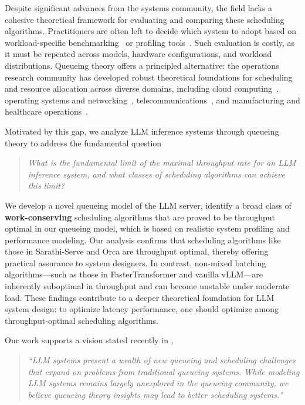 \documentclass[11pt]{article}
\theoremstyle{plain}
\theoremstyle{definition}
\theoremstyle{remark}
\begin{document}
Despite significant advances from the systems community, the field lacks a cohesive theoretical framework for evaluating and comparing these scheduling algorithms. Practitioners are often left to decide which system to adopt based on workload-specific benchmarking~\citep{databricks_llm_2023} or profiling tools~\citep{pytorch_profiler,nvidia_nsight}. Such evaluation is costly, as it must be repeated across models, hardware configurations, and workload distributions. Queueing theory offers a principled alternative: the operations research community has developed robust theoretical foundations for scheduling and resource allocation across diverse domains, including cloud computing~\citep{mitzenmacher2001power,grosof_new_2023,tirmazi_borg_2020,patke_queue_2024,ghodsi_dominant_2011,zhang2023shepherd}, operating systems and networking~\citep{yu2021nsdi,stoica1998core,iyer2023achieving,li2024libpreemptible}, telecommunications~\citep{whitt1993tail,maglaris1988performance,canetti1995bounding}, and manufacturing and healthcare operations~\citep{hu_optimal_2022,chen_optimal_2025,zychlinski_managing_2023}.


Motivated by this gap, we analyze LLM inference systems through queueing theory to address the fundamental question \begin{quote} \it{What is the fundamental limit of the maximal throughput rate for an LLM inference system, and what classes of scheduling algorithms can achieve this limit?} \end{quote}

We develop a novel queueing  model of  the LLM server, identify a broad class of \textbf{work-conserving} scheduling algorithms
that are proved to be throughput optimal in our queueing model, which is based on realistic system profiling and performance modeling. Our analysis confirms that scheduling algorithms like those in Sarathi-Serve and Orca are throughput optimal, thereby offering practical assurance to system designers. In contrast, non-mixed batching algorithms---such as those in FasterTransformer and vanilla vLLM---are inherently suboptimal in throughput and can become unstable under moderate load. These findings contribute to a deeper theoretical foundation for LLM system design: to optimize latency performance, one should optimize among throughput-optimal scheduling algorithms. 



Our work supports a vision stated recently in  \cite{mitzenmacher2025queueing}, 
\begin{quote}
    \textit{``LLM systems present a wealth of new queueing and scheduling challenges that expand on problems from traditional queueing systems. While modeling LLM systems remains largely unexplored
in the queueing community, we believe queueing theory insights may lead to better scheduling systems."}
\end{quote}
\end{document}
